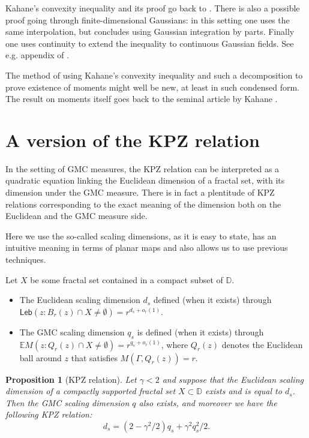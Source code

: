 \documentclass[11pt]{amsart}
\newtheorem{prop}[thm]{Proposition}
\newcommand{\D}{\mathbb D}
\newcommand{\E}{\mathbb E}
\renewcommand{\1}{\mathbf 1}
\newcommand{\Leb}{\mathsf{Leb}}
\begin{document}
Kahane's convexity inequality and its proof go back to \cite{Kah}. There is also a possible proof going through finite-dimensional Gaussians: in this setting one uses the same interpolation, but concludes using Gaussian integration by parts. Finally one uses continuity to extend the inequality to continuous Gaussian fields. See e.g. appendix of \cite{RV}.

The method of using Kahane's convexity inequality and such a decomposition to prove existence of moments might well be new, at least in such condensed form. The result on moments itself goes back to the seminal article by Kahane \cite{Kah}.

\section{A version of the KPZ relation}\label{sec:KPZ}

In the setting of GMC measures, the KPZ relation can be interpreted as a quadratic equation linking the Euclidean dimension of a fractal set, with its dimension under the GMC measure. There is in fact a plentitude of KPZ relations corresponding to the exact meaning of the dimension both on the Euclidean and the GMC measure side. 

Here we use the so-called scaling dimensions, as it is easy to state, has an intuitive meaning in terms of planar maps and also allows us to use previous techniques.

Let $X$ be some fractal set contained in a compact subset of $\D$.
\begin{itemize}
\item The Euclidean scaling dimension $d_s$ defined (when it exists) through $\Leb(z: B_r(z) \cap X \neq \emptyset)=r^{	d_s + o_r(1)}$.
\item The GMC scaling dimension $q_s$ is defined (when it exists) through $\E M(z: Q_r(z) \cap X \neq \emptyset) = r^{q_s + o_r(1)}$, where $Q_r(z)$ denotes the Euclidean ball around $z$ that satisfies $M(\Gamma,Q_r(z)) = r$. 
\end{itemize}

\begin{prop}[KPZ relation]\label{prop:KPZ}
Let $\gamma < 2$ and suppose that the Euclidean scaling dimension of a compactly supported fractal set $X \subset \D$ exists and is equal to $d_s$. Then the GMC scaling dimension $q$ also exists, and moreover we have the following KPZ relation:
$$d_s = (2-\gamma^2/2)q_s + \gamma^2q_s^2/2.$$
\end{prop}
\end{document}

